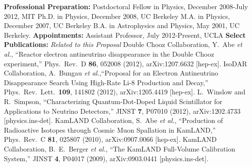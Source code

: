 


{\bf Professional Preparation:} 
\newline \noindent
Postdoctoral Fellow in Physics, December 2008-July 2012, MIT
\newline \noindent
Ph.D. in Physics, December 2008, UC Berkeley
\newline \noindent
M.A. in Physics, December 2007, UC Berkeley
\newline \noindent
B.A. in Astrophysics and Physics, May 2001, UC Berkeley.
\newline\newline \noindent
{\bf Appointments:} 
\newline \noindent
Assistant Professor, July 2012-Present, UCLA
\newline\newline \noindent
{\bf Select  Publications:}
\newline\newline\noindent
{\it Related to this Proposal}
\newline\noindent
Double Chooz Collaboration, Y.~Abe {\it et al.}, ``Reactor electron antineutrino disappearance in the Double Chooz experiment,'' Phys.\ Rev.\ D {\bf 86}, 052008 (2012), arXiv:1207.6632 [hep-ex]. 
\newline\newline \noindent
IsoDAR Collaboration, A.~Bungau {\it et al.},``Proposal for an Electron Antineutrino Disappearance Search Using High-Rate Li-8 Production and Decay,'' Phys.\ Rev.\ Lett.\  {\bf 109}, 141802 (2012),  arXiv:1205.4419 [hep-ex].
\newline\newline \noindent
L.~Winslow and R.~Simpson, ``Characterizing Quantum-Dot-Doped Liquid Scintillator for Applications to Neutrino Detectors,'' JINST {\bf 7}, P07010 (2012), arXiv:1202.4733 [physics.ins-det].
\newline\newline \noindent
KamLAND Collaboration, S.~Abe {\it et al.}, ``Production of Radioactive Isotopes through Cosmic Muon Spallation in KamLAND,'' Phys.\ Rev.\ C {\bf 81}, 025807 (2010), arXiv:0907.0066 [hep-ex].
\newline\newline \noindent
KamLAND Collaboration, B.~E.~Berger {\it et al.}, ``The KamLAND Full-Volume Calibration System,'' JINST {\bf 4}, P04017 (2009), arXiv:0903.0441 [physics.ins-det].
\newline\newline \noindent
